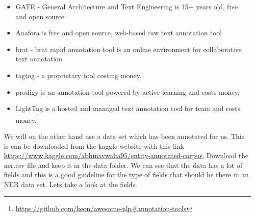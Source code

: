 \documentclass{book}
\begin{document}
\begin{itemize}
	\item GATE - General Architecture and Text Engineering is 15+ years old, free and open source
	\item Anafora is free and open source, web-based raw text annotation tool
	\item brat - brat rapid annotation tool is an online environment for collaborative text annotation
	\item tagtog - a proprietary tool costing money.
	\item prodigy is an annotation tool powered by active learning and costs money.
	\item LightTag is a hosted and managed text annotation tool for team and costs money.\footnote{\href{}{https://github.com/keon/awesome-nlp\#annotation-tools}}
\end{itemize}

We will on the other hand use a data set which has been annotated for us. This is can be downloaded from the kaggle website with this link \\
\href{}{https://www.kaggle.com/abhinavwalia95/entity-annotated-corpus}. Download the ner.csv file and keep it in the data folder. We can see that the data has a lot of fields and this is a good guideline for the type of fields that should be there in an NER data set. Lets take a look at the fields.
\end{document}
